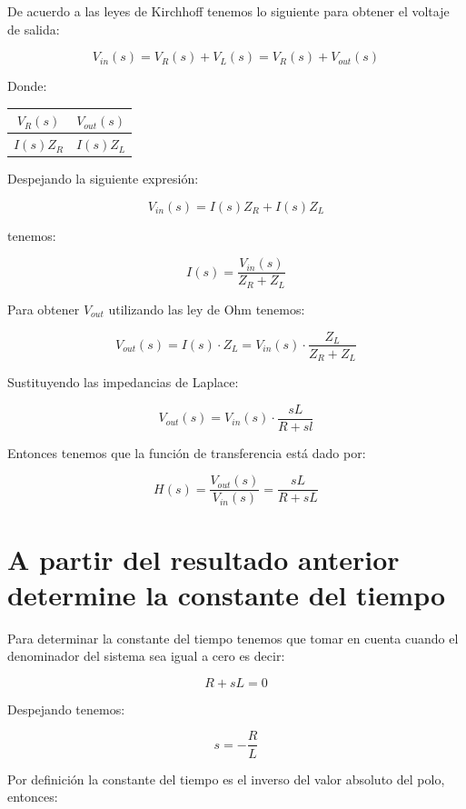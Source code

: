 \documentclass[12pt, letterpaper]{article}
\begin{document}
De acuerdo a las leyes de Kirchhoff tenemos lo siguiente para obtener el voltaje de salida:

\[V_{in}(s) = V_R(s) + V_L(s) = V_R(s) + V_{out}(s)\]

Donde:
\begin{center}
    \begin{tabular}{|c|c|}
        \hline
        \(V_R(s)\) & \(V_{out}(s)\) \\
        \hline
        \(I(s)Z_R\) & \(I(s)Z_L\) \\
        \hline
    \end{tabular}
\end{center}

Despejando la siguiente expresión:

\[V_{in}(s) = I(s)Z_R + I(s)Z_L\]

tenemos:

\[I(s) = \frac{V_{in}(s)}{Z_R + Z_L}\]

Para obtener \(V_{out}\) utilizando las ley de Ohm tenemos:

\[V_{out}(s) = I(s) \cdot Z_L = V_{in}(s)\cdot \frac{Z_L}{Z_R + Z_L}\]

Sustituyendo las impedancias de Laplace:

\[V_{out}(s) = V_{in}(s) \cdot \frac{sL}{R + sl}\]

Entonces tenemos que la función de transferencia está dado por:

\begin{center}
    \begin{tcolorbox}[colframe=red!80!black, width=8cm, sharp corners]
        \[
        H(s) = \frac{V_{out}(s)}{V_{in}(s)} = \frac{sL}{R + sL}
        \]
    \end{tcolorbox}
\end{center}


\section{A partir del resultado anterior determine la constante del tiempo}

Para determinar la constante del tiempo tenemos que tomar en cuenta cuando el denominador del sistema sea igual a cero es decir:
 
\[R + sL = 0\]

Despejando tenemos:

\[s = - \frac{R}{L}\]

Por definición la constante del tiempo es el inverso del valor absoluto del polo, entonces:
\end{document}
